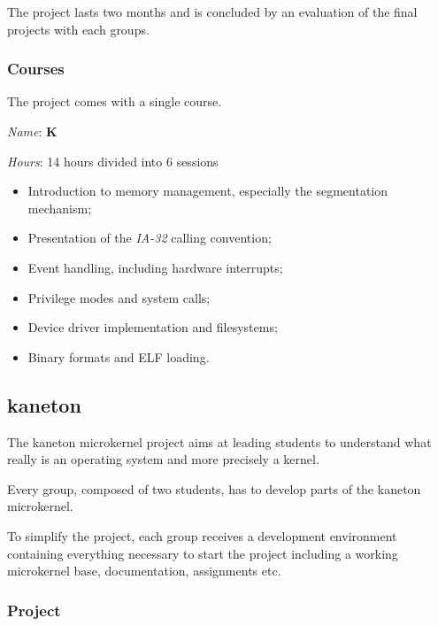 \begin{multicols}{2}
The project lasts two months and is concluded by an evaluation of the
final projects with each groups.


\subsubsection{Courses}

The project comes with a single course.


\textit{Name}: \textbf{K}

\textit{Hours}: 14 hours divided into 6 sessions

\begin{itemize}
  \item
    Introduction to memory management, especially the segmentation mechanism;
  \item
    Presentation of the \textit{IA-32} calling convention;
  \item
    Event handling, including hardware interrupts;
  \item
    Privilege modes and system calls;
  \item
    Device driver implementation and filesystems;
  \item
    Binary formats and ELF loading.
\end{itemize}

%
%

\subsection{kaneton}

The kaneton microkernel project aims at leading students to understand
what really is an operating system and more precisely a kernel.

Every group, composed of two students, has to develop parts of the kaneton
microkernel.

To simplify the project, each group receives a development environment
containing everything necessary to start the project including a
working microkernel base, documentation, assignments etc.


\subsubsection{Project}


\end{multicols}
